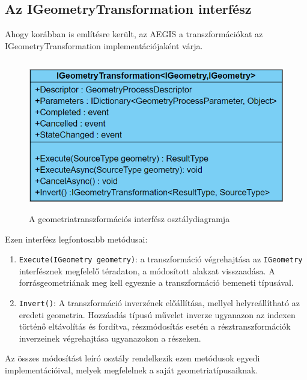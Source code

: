 \subsection{Az IGeometryTransformation interfész}
Ahogy korábban is említésre került, az AEGIS a transzformációkat az IGeometryTransformation  implementációjaként várja. 
\begin{figure}[H]
	\centering
	\includegraphics[width=\textwidth,height=250px]{images/GeomTransformIface.png}
	\caption{A geometriatranszformációs interfész osztálydiagramja}
	\label{fig:picture-9}
\end{figure}

Ezen interfész legfontosabb metódusai:
\begin{enumerate}
	\item \texttt{Execute(IGeometry geometry)}: a transzformáció végrehajtása az \texttt{IGeometry} interfésznek megfelelő téradaton, a módosított alakzat visszaadása. A forrásgeometriának meg kell egyeznie a transzformáció bemeneti típusával.
	\item \texttt{Invert()}: A transzformáció inverzének előállítása, mellyel helyreállítható az eredeti geometria. Hozzáadás típusú művelet inverze ugyanazon az indexen történő eltávolítás és fordítva, részmódosítás esetén a résztranszformációk inverzeinek végrehajtása ugyanazokon a részeken.
\end{enumerate}
Az összes módosítást leíró osztály rendelkezik ezen metódusok egyedi implementációival, melyek megfelelnek a saját geometriatípusaiknak.
